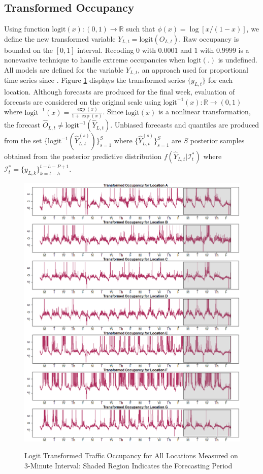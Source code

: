 \subsection{Transformed Occupancy}
Using function $\textrm{logit}(x):(0,1)\to\mathbb{R}$ such that $\phi(x)=\log [x/(1-x)]$, we define the new transformed variable $Y_{L,t}=\textrm{logit}(O_{L,t})$. Raw occupancy is bounded on the $[0,1]$ interval. Recoding $0$ with $0.0001$ and $1$ with $0.9999$ is a nonevasive technique to handle extreme occupancies when $\textrm{logit}(.)$ is undefined. All models are defined for the variable $Y_{L,t}$, an approach used for proportional time series since \cite{Wallis1987}. Figure \ref{fig:TransPlotTrafficOcc} displays the transformed series $\{y_{L,t}\}$ for each location. Although forecasts are produced for the final week, evaluation of forecasts are considered on the original scale using $\textrm{logit}^{-1}(x):\mathbb{R}\to(0,1)$ where $\textrm{logit}^{-1}(x)=\frac{\exp(x)}{1+\exp(x)}$. Since $\textrm{logit}(x)$ is a nonlinear transformation, the forecast $\hat{O}_{L,t} \neq  \textrm{logit}^{-1}(\hat{Y}_{L,t})$. Unbiased forecasts and quantiles are produced from the set $\{\textrm{logit}^{-1}(\hat{Y}^{(s)}_{L,t})\}_{s=1}^{S}$ where $\{\hat{Y}^{(s)}_{L,t}\}_{s=1}^{S}$ are $S$ posterior samples obtained from the posterior predictive distribution $f(\hat{Y}_{L,t}|\mathcal{I}^*_t)$ where $\mathcal{I}^*_t=\{y_{L,k}\}_{k=t-h}^{t-h-P+1}$.
\begin{figure}[htbp]
\caption{Logit Transformed Traffic Occupancy for All Locations Measured on 3-Minute Interval: Shaded Region Indicates the Forecasting Period}
\includegraphics[width=\textwidth]{Transplots}
\label{fig:TransPlotTrafficOcc}
\end{figure}


